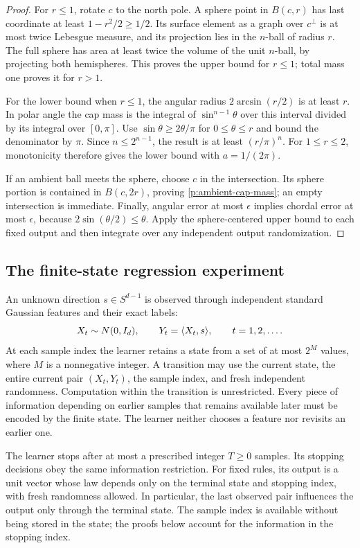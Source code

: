 \begin{proof}
For \(r\le1\), rotate \(c\) to the north pole. A sphere point in
\(B(c,r)\) has last coordinate at least \(1-r^2/2\ge1/2\). Its surface
element as a graph over \(c^\perp\) is at most twice Lebesgue measure,
and its projection lies in the \(n\)-ball of radius \(r\). The full sphere
has area at least twice the volume of the unit \(n\)-ball, by projecting
both hemispheres. This proves the upper bound for \(r\le1\); total mass
one proves it for \(r>1\).

For the lower bound when \(r\le1\), the angular radius
\(2\arcsin(r/2)\) is at least \(r\). In polar angle the cap mass is the
integral of \(\sin^{n-1}\theta\) over this interval divided by its
integral over \([0,\pi]\). Use
\(\sin\theta\ge2\theta/\pi\) for \(0\le\theta\le r\) and bound the
denominator by \(\pi\). Since \(n\le2^{n-1}\), the result is at least
\((r/\pi)^n\). For \(1\le r\le2\), monotonicity therefore gives the
lower bound with \(a=1/(2\pi)\).

If an ambient ball meets the sphere, choose \(c\) in the intersection.
Its sphere portion is contained in \(B(c,2r)\), proving
\eqref{p:ambient-cap-mass}; an empty intersection is immediate. Finally,
angular error at most \(\epsilon\) implies chordal error at most
\(\epsilon\), because \(2\sin(\theta/2)\le\theta\). Apply the
sphere-centered upper bound to each fixed output and then integrate over
any independent output randomization.
\end{proof}

\subsection{The finite-state regression experiment}

An unknown direction \(s\in S^{d-1}\) is observed through independent
standard Gaussian features and their exact labels:
\[
 X_t\sim N(0,I_d),\qquad Y_t=\langle X_t,s\rangle,\qquad t=1,2,\ldots .
\]
At each sample index the learner retains a state from a set of at most
\(2^M\) values, where \(M\) is a nonnegative integer. A transition may
use the current state, the entire current pair \((X_t,Y_t)\), the sample
index, and fresh independent randomness. Computation within the transition
is unrestricted. Every piece of information depending on earlier samples
that remains available later must be encoded by the finite state. The
learner neither chooses a feature nor revisits an earlier one.

The learner stops after at most a prescribed integer \(T\ge0\) samples.
Its stopping decisions obey the same information restriction. For fixed
rules, its output is a unit vector whose law depends only on the terminal
state and stopping index, with fresh randomness allowed. In particular,
the last observed pair influences the output only through the terminal
state. The sample index is available without being stored in the state;
the proofs below account for the information in the stopping index.

